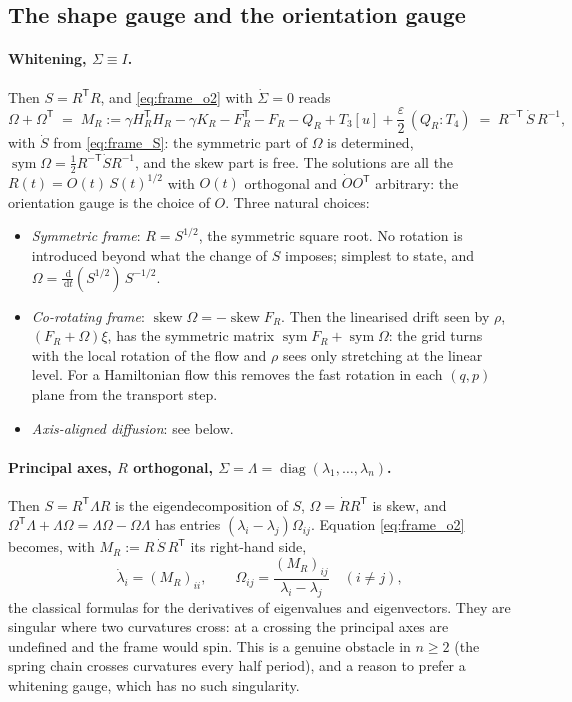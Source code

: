 \documentclass[11pt,a4paper]{article}
\newcommand{\dd}{\,\mathrm{d}}
\newcommand{\T}{^{\mathsf T}}
\newcommand{\eps}{\varepsilon}
\theoremstyle{plain}
\theoremstyle{definition}
\theoremstyle{remark}
\begin{document}
\subsection{The shape gauge and the orientation gauge}
\label{sec:frame_gauge}

\paragraph{Whitening, $\Sigma\equiv I$.}
Then $S = R\T R$, and \eqref{eq:frame_o2} with $\dot\Sigma=0$ reads
\begin{equation}
  \Omega + \Omega\T \;=\; M_R := \gamma H_R\T H_R - \gamma K_R - F_R\T - F_R - Q_R + T_3[u] + \frac\eps2\,(Q_R\!:\!T_4) \;=\; R^{-\mathsf T}\,\dot S\,R^{-1},
  \label{eq:frame_whiten}
\end{equation}
with $\dot S$ from \eqref{eq:frame_S}: the symmetric part of $\Omega$ is determined, $\operatorname{sym}\Omega = \tfrac12R^{-\mathsf T}\dot SR^{-1}$, and the skew part is free. The solutions are all the $R(t) = O(t)\,S(t)^{1/2}$ with $O(t)$ orthogonal and $\dot OO\T$ arbitrary: the orientation gauge is the choice of $O$. Three natural choices:
\begin{itemize}[leftmargin=1.5em]
  \item \emph{Symmetric frame}: $R = S^{1/2}$, the symmetric square root. No rotation is introduced beyond what the change of $S$ imposes; simplest to state, and $\Omega = \tfrac{\dd}{\dd t}(S^{1/2})\,S^{-1/2}$.
  \item \emph{Co-rotating frame}: $\operatorname{skew}\Omega = -\operatorname{skew}F_R$. Then the linearised drift seen by $\rho$, $(F_R+\Omega)\xi$, has the symmetric matrix $\operatorname{sym}F_R + \operatorname{sym}\Omega$: the grid turns with the local rotation of the flow and $\rho$ sees only stretching at the linear level. For a Hamiltonian flow this removes the fast rotation in each $(q,p)$ plane from the transport step.
  \item \emph{Axis-aligned diffusion}: see below.
\end{itemize}

\paragraph{Principal axes, $R$ orthogonal, $\Sigma=\Lambda=\operatorname{diag}(\lambda_1,\dots,\lambda_n)$.}
Then $S = R\T\Lambda R$ is the eigendecomposition of $S$, $\Omega=\dot RR\T$ is skew, and $\Omega\T\Lambda + \Lambda\Omega = \Lambda\Omega - \Omega\Lambda$ has entries $(\lambda_i-\lambda_j)\Omega_{ij}$. Equation \eqref{eq:frame_o2} becomes, with $M_R := R\,\dot S\,R\T$ its right-hand side,
\begin{equation}
  \dot\lambda_i = (M_R)_{ii}, \qquad \Omega_{ij} = \frac{(M_R)_{ij}}{\lambda_i-\lambda_j}\quad(i\ne j),
  \label{eq:frame_principal}
\end{equation}
the classical formulas for the derivatives of eigenvalues and eigenvectors. They are singular where two curvatures cross: at a crossing the principal axes are undefined and the frame would spin. This is a genuine obstacle in $n\ge2$ (the spring chain crosses curvatures every half period), and a reason to prefer a whitening gauge, which has no such singularity.
\end{document}
